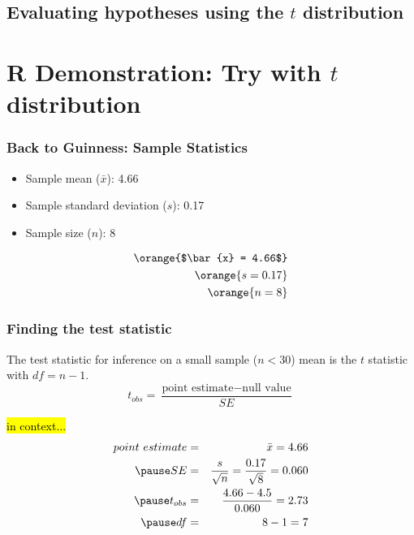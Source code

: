 \documentclass[slidestop,compress,mathserif]{beamer}
\begin{document}

\subsection{Evaluating hypotheses using the \texorpdfstring{$t$}{t} distribution}



\section{R Demonstration: Try with \texorpdfstring{$t$}{t} distribution}


\begin{frame}
\frametitle{Back to Guinness: Sample Statistics}

\begin{itemize}
\item Sample mean ($\bar{x}$): 4.66
\item Sample standard deviation ($s$): 0.17
\item Sample size ($n$): 8
\end{itemize}

\begin{align*}
\orange{$\bar{x} = 4.66$} \\
\orange{s = 0.17} \\
\orange{n = 8}
\end{align*}

\end{frame}



\begin{frame}
\frametitle{Finding the test statistic}

{The test statistic for inference on a small sample ($n < 30$) mean is the $t$ statistic with $df = n - 1$.
\[ t_{obs} = \frac{\text{point estimate} - \text{null value}}{SE} \]}

\pause

\vspace{-0.5cm}

\hl{in context...}
\begin{eqnarray*}
point~estimate &=& \bar{x} = 4.66 \\
\pause
SE &=& \frac{s}{\sqrt{n}} = \frac{0.17}{\sqrt{8}} = 0.060 \\
\pause
t_{obs} &=& \frac{4.66 - 4.5}{0.060} = 2.73 \\
\pause
df &=& 8 - 1 = 7
\end{eqnarray*}

\vspace{-0.25cm}


\end{frame}
\end{document}
